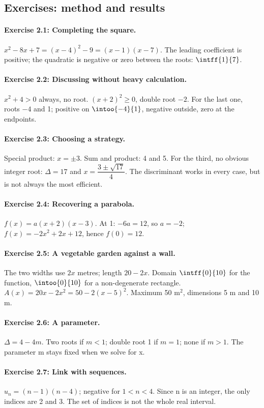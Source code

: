 \subsection*{Exercises: method and results}
\paragraph{Exercise 2.1: Completing the square.} $x^2-8x+7=(x-4)^2-9=(x-1)(x-7)$. The leading coefficient is positive; the quadratic is negative or zero between the roots: $\intff{1}{7}$.
\paragraph{Exercise 2.2: Discussing without heavy calculation.} $x^2+4>0$ always, no root. $(x+2)^2\geq0$, double root $-2$. For the last one, roots $-4$ and 1; positive on $\intoo{-4}{1}$, negative outside, zero at the endpoints.
\paragraph{Exercise 2.3: Choosing a strategy.} Special product: $x=\pm3$. Sum and product: 4 and 5. For the third, no obvious integer root: $\Delta=17$ and $x=\dfrac{3\pm\sqrt{17}}{4}$. The discriminant works in every case, but is not always the most efficient.
\paragraph{Exercise 2.4: Recovering a parabola.} $f(x)=a(x+2)(x-3)$. At 1: $-6a=12$, so $a=-2$; $f(x)=-2x^2+2x+12$, hence $f(0)=12$.
\paragraph{Exercise 2.5: A vegetable garden against a wall.} The two widths use $2x$ metres; length $20-2x$. Domain $\intff{0}{10}$ for the function, $\intoo{0}{10}$ for a non-degenerate rectangle. $A(x)=20x-2x^2=50-2(x-5)^2$. Maximum 50 m$^2$, dimensions 5 m and 10 m.
\paragraph{Exercise 2.6: A parameter.} $\Delta=4-4m$. Two roots if $m<1$; double root 1 if $m=1$; none if $m>1$. The parameter m stays fixed when we solve for x.
\paragraph{Exercise 2.7: Link with sequences.} $u_n=(n-1)(n-4)$; negative for $1<n<4$. Since n is an integer, the only indices are 2 and 3. The set of indices is not the whole real interval.
